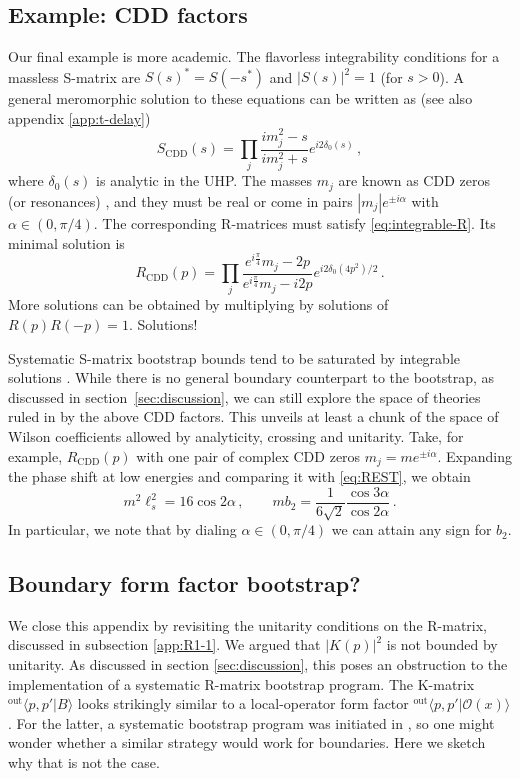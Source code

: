 \documentclass[
 reprint,
 amsmath,
 pre,
 amssymb,
 nofootinbib,
 aps,
 longbibliography,
]{revtex4-1}
\newcommand{\<}{{\langle}}
\renewcommand{\>}{{\rangle}}
\begin{document}
\subsection{Example: CDD factors}\label{app:CDD}
Our final example is more academic. The flavorless integrability conditions for a massless S-matrix are $S(s)^*=S(-s^*)$ and $|S(s)|^2=1$ (for $s>0$). A general meromorphic solution to these equations can be written as \cite{Zamolodchikov:1991vx} (see also appendix \ref{app:t-delay})
\begin{equation}\label{eq:SCDD}
    S_{\text{CDD}}(s) = \prod_j \frac{im_j^2 - s}{im_j^2 + s}e^{i 2\delta_0(s)}\,,
\end{equation}
where $\delta_0(s)$ is analytic in the UHP. The masses $m_j$ are known as CDD zeros (or resonances) \cite{Castillejo:1955ed}, and they must be real or come in pairs $|m_j|e^{\pm i \alpha}$ with $\alpha\in (0,\pi/4)$. The corresponding R-matrices must satisfy \eqref{eq:integrable-R}. Its minimal solution is
\begin{equation}
    R_\text{CDD}(p) = \prod_j \frac{e^{i\frac{\pi}{4}} m_j - 2p}{e^{i\frac{\pi}{4}} m_j - i2p} e^{i 2\delta_0(4p^2)/2}
    \,.
\end{equation}
More solutions can be obtained by multiplying by solutions of $R(p)R(-p)=1$. Solutions!

Systematic S-matrix bootstrap bounds tend to be saturated by integrable solutions \cite{Paulos:2016but,EliasMiro:2019kyf}. While there is no general boundary counterpart to the bootstrap,
as discussed in section~\ref{sec:discussion},
we can still explore the space of theories ruled in by the above CDD factors. This unveils at least a chunk of the space of Wilson coefficients allowed by analyticity, crossing and unitarity. Take, for example, $R_\text{CDD}(p)$ with one pair of complex CDD zeros $m_j = m e^{\pm i \alpha}$. Expanding the phase shift at low energies and comparing it with \eqref{eq:REST}, we obtain
\begin{equation}
    m^2\ell_s^2 = 16\cos 2\alpha\,, \qquad m b_2 = \frac{1}{6\sqrt{2}}\frac{\cos 3\alpha}{\cos 2\alpha}\,.
\end{equation}
In particular, we note that by dialing $\alpha\in (0,\pi/4)$ we can attain any sign for $b_2$.

\subsection{Boundary form factor bootstrap?}\label{app:FFunit}
We close this appendix by revisiting the unitarity conditions on the R-matrix, discussed in subsection \ref{app:R1-1}. We argued that $|K(p)|^2$ is not bounded by unitarity. As discussed in section \ref{sec:discussion}, this poses an obstruction to the implementation of a systematic R-matrix bootstrap program. The K-matrix ${}^{\text{out}}\langle p,p' | B\rangle$ looks strikingly similar to a local-operator form factor ${}^{\text{out}}\langle p,p' | \mathcal O(x)\rangle$. For the latter, a systematic bootstrap program was initiated in \cite{Karateev:2019ymz}, so one might wonder whether a similar strategy would work for boundaries. Here we sketch why that is not the case.
\end{document}
